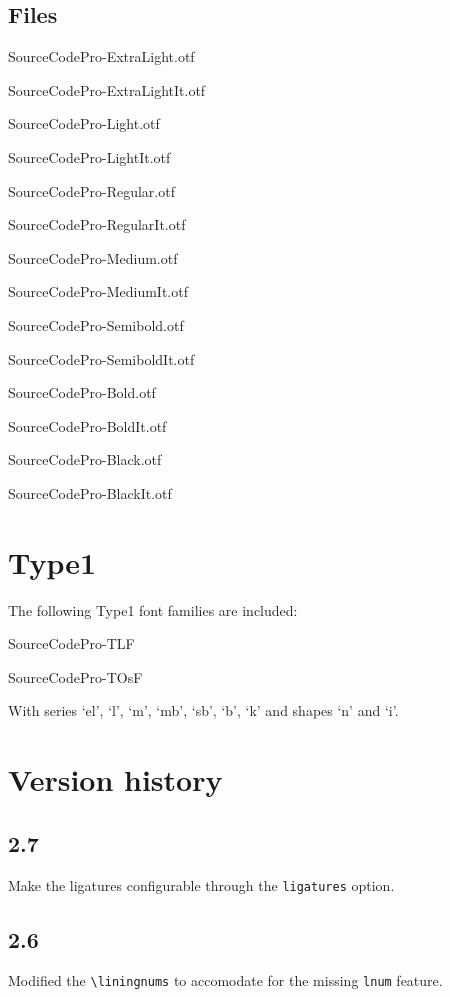 \documentclass[10pt,a4paper,english]{article}
\begin{document}
\begin{multicols}{2}
\subsection{Files}
\begin{itemize*}
	\item SourceCodePro-ExtraLight.otf
	\item SourceCodePro-ExtraLightIt.otf
	\item SourceCodePro-Light.otf
	\item SourceCodePro-LightIt.otf
	\item SourceCodePro-Regular.otf
	\item SourceCodePro-RegularIt.otf
	\item SourceCodePro-Medium.otf
	\item SourceCodePro-MediumIt.otf	
	\item SourceCodePro-Semibold.otf
	\item SourceCodePro-SemiboldIt.otf
	\item SourceCodePro-Bold.otf
	\item SourceCodePro-BoldIt.otf
	\item SourceCodePro-Black.otf
	\item SourceCodePro-BlackIt.otf
\end{itemize*}

\section{Type1}
The following Type1 font families are included:
\begin{itemize*}
	\item SourceCodePro-TLF
	\item SourceCodePro-TOsF
\end{itemize*}
With series ‘el’, ‘l’, ‘m’, ‘mb’, ‘sb’, ‘b’, ‘k’ and shapes ‘n’ and ‘i’.

\section{Version history}
\subsection*{2.7}
\begin{itemize*}
	\item Make the ligatures configurable through the \texttt{ligatures} option.
\end{itemize*}

\subsection*{2.6}
\begin{itemize*}
	\item Modified the \texttt{\textbackslash liningnums} to accomodate for the missing \texttt{lnum} feature.
\end{itemize*}


\end{multicols}
\end{document}
